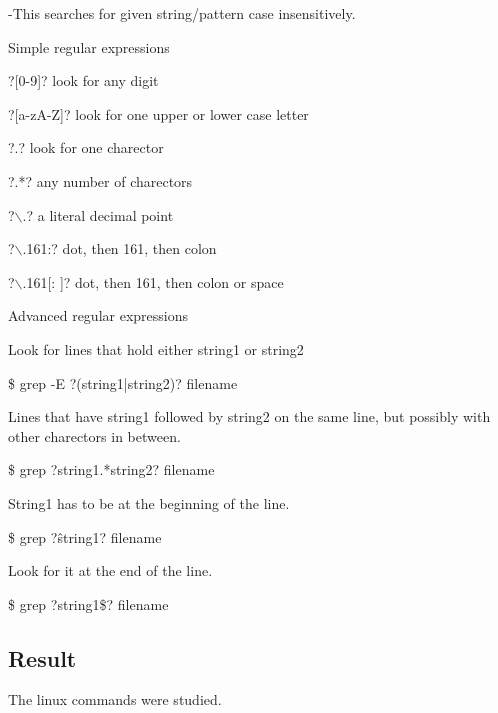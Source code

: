 \documentclass{article}
\begin{document}
				\hspace{10mm}-This searches for given string/pattern case insensitively.


	Simple regular expressions

				\hspace{10mm}?[0-9]? look for any digit



				\hspace{10mm}?[a-zA-Z]? look for one upper or lower case letter	


				\hspace{10mm}?.? look for one charector
				
				\hspace{10mm}?.*? any number of charectors
				
				\hspace{10mm} ?$\backslash$.? a literal decimal point
				
				\hspace{10mm}?$\backslash$.161:? dot, then 161, then colon 
				
				\hspace{10mm}?$\backslash$.161[: ]? dot, then 161, then colon or space	


	Advanced regular expressions

				\hspace{10mm}Look for lines that hold either string1 or string2
				
				\hspace{10mm}\$ grep -E ?(string1|string2)? filename 
				
				\hspace{10mm}Lines that have string1 followed by string2 on the same line, but possibly with other charectors in between.
				
				\hspace{10mm}\$ grep ?string1.*string2? filename	
				
				\hspace{10mm}String1 has to be at the beginning of the line.
				
				\hspace{10mm}\$ grep ?\^string1? filename
				
				Look for it at the end of the line.
				
				\hspace{10mm}\$ grep ?string1\$? filename
				

\subsection{Result}
The linux commands were studied.
\end{document}
